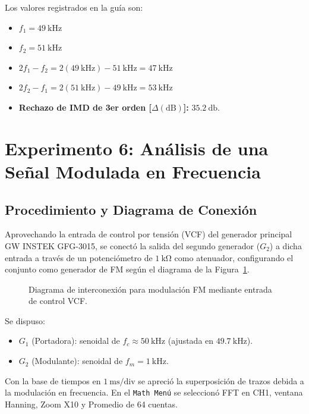 Los valores registrados en la guía son:
\begin{itemize}
    \item $f_1 = \qty{49}{\kilo\hertz}$
    \item $f_2 = \qty{51}{\kilo\hertz}$
    \item $2f_1 - f_2 = 2(\qty{49}{\kilo\hertz}) - \qty{51}{\kilo\hertz} = \qty{47}{\kilo\hertz}$
    \item $2f_2 - f_1 = 2(\qty{51}{\kilo\hertz}) - \qty{49}{\kilo\hertz} = \qty{53}{\kilo\hertz}$
    \item \textbf{Rechazo de IMD de 3er orden [$\Delta(\text{dB})$]:} $\qty{35.2}{\decibel}$.
\end{itemize}

\section{Experimento 6: Análisis de una Señal Modulada en Frecuencia}
\label{sec.ej6:modulacion_fm}

\subsection{Procedimiento y Diagrama de Conexión}
Aprovechando la entrada de control por tensión (VCF) del generador principal GW INSTEK GFG-3015, se conectó la salida
del segundo generador ($G_2$) a dicha entrada a través de un potenciómetro de $\qty{1}{\kilo\ohm}$ como atenuador,
configurando el conjunto como generador de FM según el diagrama de la Figura~\ref{crkt.ej6:conexion_fm}.

\begin{figure}[!ht]
    \centering
    
    \caption{Diagrama de interconexión para modulación FM mediante entrada de control VCF.}
    \label{crkt.ej6:conexion_fm}
\end{figure}

Se dispuso:
\begin{itemize}
    \item $G_1$ (Portadora): senoidal de $f_c \approx \qty{50}{\kilo\hertz}$ (ajustada en $\qty{49.7}{\kilo\hertz}$).
    \item $G_2$ (Modulante): senoidal de $f_m = \qty{1}{\kilo\hertz}$.
\end{itemize}
Con la base de tiempos en $\qty{1}{\milli\second\per\text{div}}$ se apreció la superposición de trazos debida a la modulación
en frecuencia. En el \texttt{Math Menú} se seleccionó FFT en CH1, ventana Hanning, Zoom X10 y Promedio de 64 cuentas.

